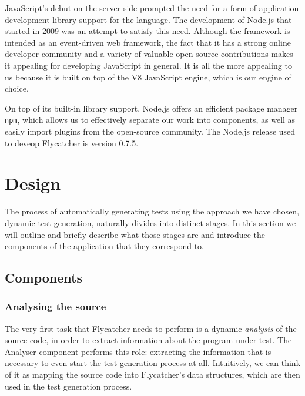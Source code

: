 JavaScript's debut on the server side prompted the need for a form of application development library support for the language. The development of \textsf{Node.js} that started in 2009 was an attempt to satisfy this need. Although the framework is intended as an event-driven web framework, the fact that it has a strong online developer community and a variety of valuable open source contributions makes it appealing for developing JavaScript in general. It is all the more appealing to us because it is built on top of the V8 JavaScript engine, which is our engine of choice.

On top of its built-in library support, \textsf{Node.js} offers an efficient package manager \texttt{npm}, which allows us to effectively separate our work into components, as well as easily import plugins from the open-source community. The \textsf{Node.js} release used to deveop \textsf{Flycatcher} is version 0.7.5.


\section{Design}
The process of automatically generating tests using the approach we have chosen, dynamic test generation, naturally divides into distinct stages. In this section we will outline and briefly describe what those stages are and introduce the components of the application that they correspond to.

\subsection{Components}
\subsubsection{Analysing the source}
The very first task that \textsf{Flycatcher} needs to perform is a dynamic \emph{analysis} of the source code, in order to extract information about the program under test. The \textsf{Analyser} component performs this role: extracting the information that is necessary to even start the test generation process at all. Intuitively, we can think of it as mapping the source code into \textsf{Flycatcher}'s data structures, which are then used in the test generation process.

